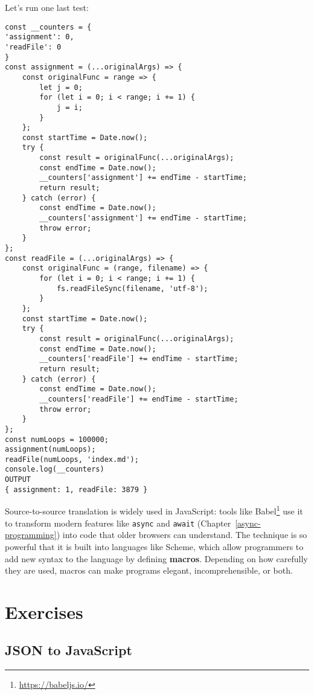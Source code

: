 \documentclass[krantzl]{krantz}
\newcommand{\chapref}[1]{Chapter~\ref{#1}}
\newcommand{\glossref}[1]{\textbf{#1}}
\newcommand{\hreffoot}[2]{{#1}\footnote{\href{#2}{#2}}}
\begin{document}
Let’s run one last test:


\begin{lstlisting}[frame=tblr,backgroundcolor=\color{black!5}]
const __counters = {
'assignment': 0,
'readFile': 0
}
const assignment = (...originalArgs) => {
    const originalFunc = range => {
        let j = 0;
        for (let i = 0; i < range; i += 1) {
            j = i;
        }
    };
    const startTime = Date.now();
    try {
        const result = originalFunc(...originalArgs);
        const endTime = Date.now();
        __counters['assignment'] += endTime - startTime;
        return result;
    } catch (error) {
        const endTime = Date.now();
        __counters['assignment'] += endTime - startTime;
        throw error;
    }
};
const readFile = (...originalArgs) => {
    const originalFunc = (range, filename) => {
        for (let i = 0; i < range; i += 1) {
            fs.readFileSync(filename, 'utf-8');
        }
    };
    const startTime = Date.now();
    try {
        const result = originalFunc(...originalArgs);
        const endTime = Date.now();
        __counters['readFile'] += endTime - startTime;
        return result;
    } catch (error) {
        const endTime = Date.now();
        __counters['readFile'] += endTime - startTime;
        throw error;
    }
};
const numLoops = 100000;
assignment(numLoops);
readFile(numLoops, 'index.md');
console.log(__counters)
OUTPUT
{ assignment: 1, readFile: 3879 }
\end{lstlisting}



Source-to-source translation is widely used in JavaScript:
tools like \hreffoot{Babel}{https://babeljs.io/} use it to transform modern features like \texttt{async} and \texttt{await}
(\chapref{async-programming})
into code that older browsers can understand.
The technique is so powerful that it is built into languages like Scheme,
which allow programmers to add new syntax to the language
by defining \glossref{macros}.
Depending on how carefully they are used,
macros can make programs elegant, incomprehensible, or both.

\section{Exercises}\label{code-generator-exercises}

\subsection*{JSON to JavaScript}
\end{document}
